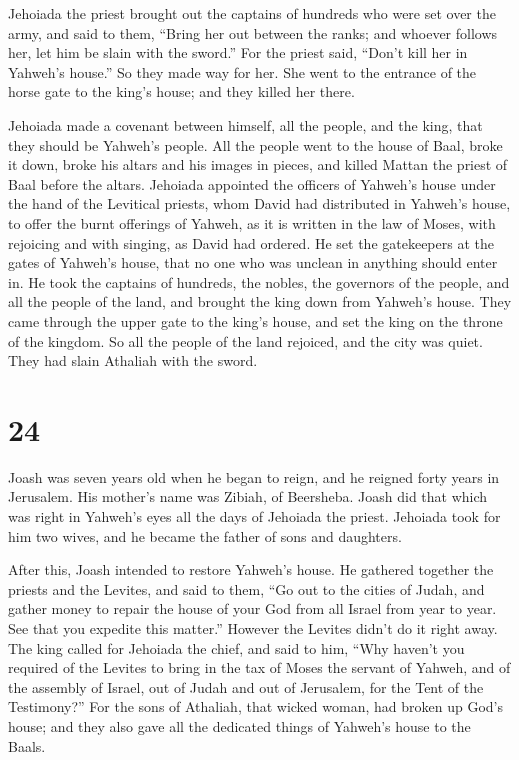  Jehoiada the priest brought out the captains of hundreds
who were set over the army, and said to them, ``Bring her out between
the ranks; and whoever follows her, let him be slain with the sword.''
For the priest said, ``Don't kill her in Yahweh's house.''
 So they made way for her. She went to the entrance of
the horse gate to the king's house; and they killed her there.

 Jehoiada made a covenant between himself, all the
people, and the king, that they should be Yahweh's people.
 All the people went to the house of Baal, broke it down,
broke his altars and his images in pieces, and killed Mattan the priest
of Baal before the altars.  Jehoiada appointed the
officers of Yahweh's house under the hand of the Levitical priests, whom
David had distributed in Yahweh's house, to offer the burnt offerings of
Yahweh, as it is written in the law of Moses, with rejoicing and with
singing, as David had ordered.  He set the gatekeepers at
the gates of Yahweh's house, that no one who was unclean in anything
should enter in.  He took the captains of hundreds, the
nobles, the governors of the people, and all the people of the land, and
brought the king down from Yahweh's house. They came through the upper
gate to the king's house, and set the king on the throne of the kingdom.
 So all the people of the land rejoiced, and the city was
quiet. They had slain Athaliah with the sword.

\hypertarget{section-23}{%
\section{24}\label{section-23}}

 Joash was seven years old when he began to reign, and he
reigned forty years in Jerusalem. His mother's name was Zibiah, of
Beersheba.  Joash did that which was right in Yahweh's
eyes all the days of Jehoiada the priest.  Jehoiada took
for him two wives, and he became the father of sons and daughters.

 After this, Joash intended to restore Yahweh's house.
 He gathered together the priests and the Levites, and
said to them, ``Go out to the cities of Judah, and gather money to
repair the house of your God from all Israel from year to year. See that
you expedite this matter.'' However the Levites didn't do it right away.
 The king called for Jehoiada the chief, and said to him,
``Why haven't you required of the Levites to bring in the tax of Moses
the servant of Yahweh, and of the assembly of Israel, out of Judah and
out of Jerusalem, for the Tent of the Testimony?''  For
the sons of Athaliah, that wicked woman, had broken up God's house; and
they also gave all the dedicated things of Yahweh's house to the Baals.

